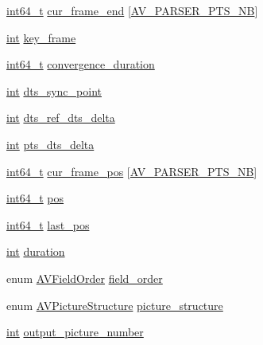 \begin{DoxyCompactItemize}
\hyperlink{lib-src_2ffmpeg_2win32_2stdint_8h_a67a9885ef4908cb72ce26d75b694386c}{int64\+\_\+t} \hyperlink{struct_a_v_codec_parser_context_a0bcb2d2925118607396a86cddf5d2add}{cur\+\_\+frame\+\_\+end} \mbox{[}\hyperlink{avcodec_8h_ab16338725f6f17d4acce3cc80b210f01}{A\+V\+\_\+\+P\+A\+R\+S\+E\+R\+\_\+\+P\+T\+S\+\_\+\+NB}\mbox{]}
\item 
\hyperlink{xmltok_8h_a5a0d4a5641ce434f1d23533f2b2e6653}{int} \hyperlink{struct_a_v_codec_parser_context_ac115e048335e4a7f1d85541cebcf2013}{key\+\_\+frame}
\item 
\hyperlink{lib-src_2ffmpeg_2win32_2stdint_8h_a67a9885ef4908cb72ce26d75b694386c}{int64\+\_\+t} \hyperlink{struct_a_v_codec_parser_context_a720d361a167efcd43612fcf6ec57a2af}{convergence\+\_\+duration}
\item 
\hyperlink{xmltok_8h_a5a0d4a5641ce434f1d23533f2b2e6653}{int} \hyperlink{struct_a_v_codec_parser_context_af966b95c5e701aacc4feffd678d4e4ba}{dts\+\_\+sync\+\_\+point}
\item 
\hyperlink{xmltok_8h_a5a0d4a5641ce434f1d23533f2b2e6653}{int} \hyperlink{struct_a_v_codec_parser_context_a0938e2e1fb7543727fded955ccce88ca}{dts\+\_\+ref\+\_\+dts\+\_\+delta}
\item 
\hyperlink{xmltok_8h_a5a0d4a5641ce434f1d23533f2b2e6653}{int} \hyperlink{struct_a_v_codec_parser_context_a9d513dbc8c575da415f73a7e57db250a}{pts\+\_\+dts\+\_\+delta}
\item 
\hyperlink{lib-src_2ffmpeg_2win32_2stdint_8h_a67a9885ef4908cb72ce26d75b694386c}{int64\+\_\+t} \hyperlink{struct_a_v_codec_parser_context_a9587a98646942a36bc1f676e6276d331}{cur\+\_\+frame\+\_\+pos} \mbox{[}\hyperlink{avcodec_8h_ab16338725f6f17d4acce3cc80b210f01}{A\+V\+\_\+\+P\+A\+R\+S\+E\+R\+\_\+\+P\+T\+S\+\_\+\+NB}\mbox{]}
\item 
\hyperlink{lib-src_2ffmpeg_2win32_2stdint_8h_a67a9885ef4908cb72ce26d75b694386c}{int64\+\_\+t} \hyperlink{struct_a_v_codec_parser_context_a6cb1cf94ba19b6df4aa2c3c0a43beac7}{pos}
\item 
\hyperlink{lib-src_2ffmpeg_2win32_2stdint_8h_a67a9885ef4908cb72ce26d75b694386c}{int64\+\_\+t} \hyperlink{struct_a_v_codec_parser_context_ad35a0f678d317123f179f3c73d63271d}{last\+\_\+pos}
\item 
\hyperlink{xmltok_8h_a5a0d4a5641ce434f1d23533f2b2e6653}{int} \hyperlink{struct_a_v_codec_parser_context_a051e3628c43876e42cfcff99ea0fc44c}{duration}
\item 
enum \hyperlink{group__lavc__core_ga957ef25581a6b3c98589817b1cbed02c}{A\+V\+Field\+Order} \hyperlink{struct_a_v_codec_parser_context_a4c43b9d404eb4a07aab63c98b0093941}{field\+\_\+order}
\item 
enum \hyperlink{group__lavc__parsing_gaad2e1cb6faa858b3558c5182d3ec56aa}{A\+V\+Picture\+Structure} \hyperlink{struct_a_v_codec_parser_context_a8dd687b78f23d6f2160b853b6d1dee08}{picture\+\_\+structure}
\item 
\hyperlink{xmltok_8h_a5a0d4a5641ce434f1d23533f2b2e6653}{int} \hyperlink{struct_a_v_codec_parser_context_a9d1e1c94451f877cbfd55e8cb3367f18}{output\+\_\+picture\+\_\+number}
\end{DoxyCompactItemize}


